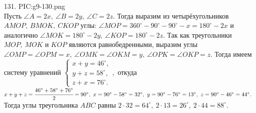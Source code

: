 131. {{PIC:g9-130.png}}\\
Пусть $\angle A=2x,\ \angle B=2y,\ \angle C=2z.$ Тогда выразим из четырёхугольников $AMOP,\ BMOK,\ CKOP$ углы: $\angle MOP=360^\circ-90^\circ-90^\circ-x=180^\circ-2x$ и аналогично $\angle MOK=180^\circ-2y,\ \angle KOP=180^\circ-2z.$ Так как треугольники $MOP,\ MOK$ и $KOP$ являются равнобедренными, выразим углы $\angle OMP=\angle OPM=x,\ \angle OMK=\angle OKM=y,\ \angle OPK=\angle OKP=z.$ Тогда имеем систему уравнений $\begin{cases} x+y=46^\circ,\\ y+z=58^\circ,\\ z+x=76^\circ.\end{cases},$ откуда $x+y+z=\cfrac{46^\circ+58^\circ+76^\circ}{2}=90^\circ,\ x=90^\circ-58^\circ=32^\circ,\ y=90^\circ-76^\circ=13^\circ,\ z=90^\circ-46^\circ=44^\circ.$ Тогда углы треугольника $ABC$ равны $2\cdot32=64^\circ,\ 2\cdot13=26^\circ,\ 2\cdot44=88^\circ.$\\

